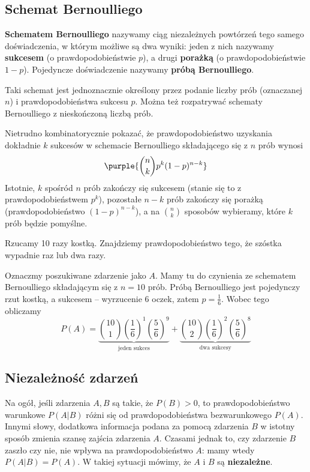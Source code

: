 \subsection{Schemat Bernoulliego}

\textbf{Schematem Bernoulliego} nazywamy ciąg niezależnych powtórzeń tego samego doświadczenia, w którym możliwe są dwa wyniki: jeden z nich nazywamy \textbf{sukcesem} (o prawdopodobieństwie $p$), a drugi \textbf{porażką} (o prawdopodobieństwie $1 - p$). Pojedyncze doświadczenie nazywamy \textbf{próbą Bernoulliego}.

Taki schemat jest jednoznacznie określony przez podanie liczby prób (oznaczanej $n$) i prawdopodobieństwa sukcesu $p$. Można też rozpatrywać schematy Bernoulliego z nieskończoną liczbą prób.

Nietrudno kombinatorycznie pokazać, że prawdopodobieństwo uzyskania dokładnie $k$ sukcesów w schemacie Bernoulliego składającego się z $n$ prób wynosi
$$\purple{\binom{n}{k} p^k (1 - p)^{n - k}}$$
Istotnie, $k$ spośród $n$ prób zakończy się sukcesem (stanie się to z prawdopodobieństwem $p^k$), pozostałe $n - k$ prób zakończy się porażką (prawdopodobieństwo $(1 - p)^{n - k}$), a na $\binom{n}{k}$ sposobów wybieramy, które $k$ prób będzie pomyślne.

\begin{example}
    Rzucamy 10 razy kostką. Znajdziemy prawdopodobieństwo tego, że szóstka wypadnie raz lub dwa razy.

    Oznaczmy poszukiwane zdarzenie jako $A$. Mamy tu do czynienia ze schematem Bernoulliego składającym się z $n = 10$ prób. Próbą Bernoulliego jest pojedynczy rzut kostką, a sukcesem -- wyrzucenie 6 oczek, zatem $p = \frac{1}{6}$. Wobec tego obliczamy
    $$P(A) = \underbrace{\binom{10}{1} \left(\frac{1}{6}\right)^1 \left(\frac{5}{6}\right)^9}_{\text{jeden sukces}} + \underbrace{\binom{10}{2} \left(\frac{1}{6}\right)^2 \left(\frac{5}{6}\right)^8}_{\text{dwa sukcesy}}$$
\end{example}

\subsection{Niezależność zdarzeń}

Na ogół, jeśli zdarzenia $A, B$ są takie, że $P(B) > 0$, to prawdopodobieństwo warunkowe $P(A | B)$ różni się od prawdopodobieństwa bezwarunkowego $P(A)$. Innymi słowy, dodatkowa informacja podana za pomocą zdarzenia $B$ w istotny sposób zmienia szansę zajścia zdarzenia $A$. Czasami jednak to, czy zdarzenie $B$ zaszło czy nie, nie wpływa na prawdopodobieństwo $A$: mamy wtedy $P(A | B) = P(A)$. W takiej sytuacji mówimy, że $A$ i $B$ są \textbf{niezależne}.

